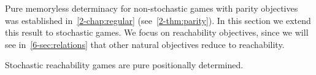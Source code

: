 
Pure memoryless determinacy for non-stochastic games with parity
objectives was established in~\cref{2-chap:regular} (see~\cref{2-thm:parity}). 
In this section we extend this result to stochastic games. 
We focus on reachability objectives, since we will see in~\cref{6-sec:relations} 
that other natural objectives reduce to reachability.


\begin{theorem}
\label{6-thm:determinacy}
Stochastic reachability games are pure positionally determined.
\end{theorem}

